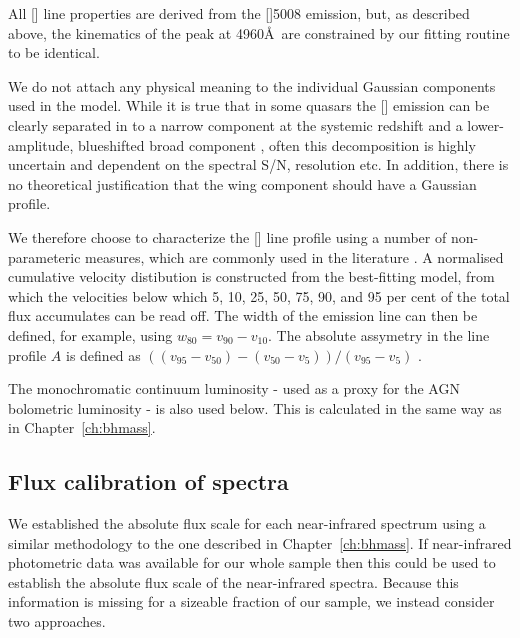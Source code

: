 All [] line properties are derived from the []5008 emission, but, as described above, the kinematics of the peak at 4960\AA\, are constrained by our fitting routine to be identical.

We do not attach any physical meaning to the individual Gaussian components used in the model. 
While it is true that in some quasars the [] emission can be clearly separated in to a narrow component at the systemic redshift and a lower-amplitude, blueshifted broad component \citep[e.g.][]{shen16a}, often this decomposition is highly uncertain and dependent on the spectral \ac{S/N}, resolution etc.
In addition, there is no theoretical justification that the wing component should have a Gaussian profile.  

We therefore choose to characterize the [] line profile using a number of non-parameteric measures, which are commonly used in the literature \citep[e.g.][]{zakamska14,zakamska16}. 
A normalised cumulative velocity distibution is constructed from the best-fitting model, from which the velocities below which 5, 10, 25, 50, 75, 90, and 95 per cent of the total flux accumulates can be read off. 
The width of the emission line can then be defined, for example, using $w_{80} = v_{90} - v_{10}$. 
The absolute assymetry in the line profile $A$ is defined as $((v_{95} - v_{50}) - (v_{50} - v_{5})) / (v_{95} - v_{5})$ \citep{zakamska14}. 

The monochromatic continuum luminosity - used as a proxy for the \ac{AGN} bolometric luminosity - is also used below. 
This is calculated in the same way as in Chapter~\ref{ch:bhmass}. 

\subsection{Flux calibration of spectra}

We established the absolute flux scale for each near-infrared spectrum using a similar methodology to the one described in Chapter~\ref{ch:bhmass}. 
If near-infrared photometric data was available for our whole sample then this could be used to establish the absolute flux scale of the near-infrared spectra. 
Because this information is missing for a sizeable fraction of our sample, we instead consider two approaches. 

